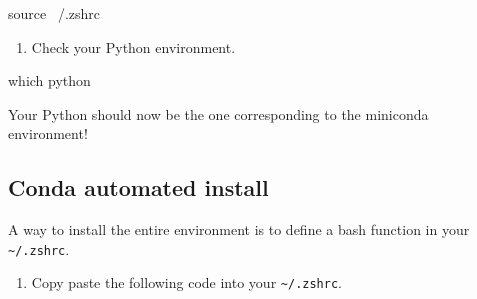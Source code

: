 \documentclass[]{article}
\newenvironment{Shaded}{\begin{snugshade}}{\end{snugshade}}
\newcommand{\NormalTok}[1]{\textcolor[rgb]{0.81,0.81,0.76}{#1}}
\providecommand{\tightlist}{%
  \setlength{\itemsep}{0pt}\setlength{\parskip}{0pt}}
\begin{document}
\begin{Shaded}
\begin{Highlighting}[]
\NormalTok{source ~/.zshrc}
\end{Highlighting}
\end{Shaded}

\begin{enumerate}
\def\labelenumi{\arabic{enumi}.}
\setcounter{enumi}{5}
\tightlist
\item
  Check your Python environment.
\end{enumerate}

\begin{Shaded}
\begin{Highlighting}[]
\NormalTok{which python}
\end{Highlighting}
\end{Shaded}

Your Python should now be the one corresponding to the miniconda
environment!

\hypertarget{conda-automated-install}{%
\subsection{Conda automated install}\label{conda-automated-install}}

A way to install the entire environment is to define a bash function in
your \texttt{\textasciitilde{}/.zshrc}.

\begin{enumerate}
\def\labelenumi{\arabic{enumi}.}
\tightlist
\item
  Copy paste the following code into your
  \texttt{\textasciitilde{}/.zshrc}.
\end{enumerate}
\end{document}
